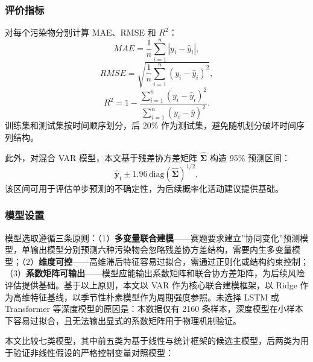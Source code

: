 \documentclass[UTF8,a4paper,12pt]{ctexart}
\begin{document}
\subsubsection{评价指标}

对每个污染物分别计算 MAE、RMSE 和 $R^2$：
\begin{equation}
\label{eq:mae}
MAE=\frac{1}{n}\sum_{i=1}^{n}|y_i-\hat{y}_i|,
\end{equation}
\begin{equation}
\label{eq:rmse}
RMSE=\sqrt{\frac{1}{n}\sum_{i=1}^{n}(y_i-\hat{y}_i)^2},
\end{equation}
\begin{equation}
\label{eq:r2}
R^2=1-\frac{\sum_{i=1}^{n}(y_i-\hat{y}_i)^2}{\sum_{i=1}^{n}(y_i-\bar{y})^2}.
\end{equation}
训练集和测试集按时间顺序划分，后 20\% 作为测试集，避免随机划分破坏时间序列结构。

此外，对混合 VAR 模型，本文基于残差协方差矩阵 $\hat{\boldsymbol{\Sigma}}$ 构造 95\% 预测区间：
\begin{equation}
\label{eq:pred_interval}
\hat{\mathbf{y}}_t \pm 1.96\,\text{diag}\!\left(\hat{\boldsymbol{\Sigma}}\right)^{1/2},
\end{equation}
该区间可用于评估单步预测的不确定性，为后续概率化活动建议提供基础。

\subsubsection{模型设置}

模型选取遵循三条原则：（1）\textbf{多变量联合建模}——赛题要求建立”协同变化”预测模型，单输出模型分别预测六种污染物会忽略残差协方差结构，需要内生多变量模型；（2）\textbf{维度可控}——高维滞后特征容易过拟合，需通过正则化或结构约束控制；（3）\textbf{系数矩阵可输出}——模型应能输出系数矩阵和联合协方差矩阵，为后续风险评估提供基础。基于以上原则，本文以 VAR 作为核心联合建模框架，以 Ridge 作为高维特征基线，以季节性朴素模型作为周期强度参照。未选择 LSTM 或 Transformer 等深度模型的原因是：本数据仅有 2160 条样本，深度模型在小样本下容易过拟合，且无法输出显式的系数矩阵用于物理机制验证。


本文比较七类模型，其中前五类为基于线性与统计框架的候选主模型，后两类为用于验证非线性假设的严格控制变量对照模型：
\end{document}
